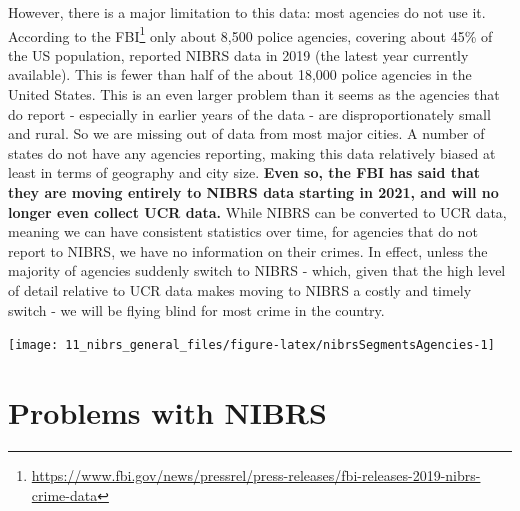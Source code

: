 \documentclass[
]{krantz}
\let\origfigure\figure
\let\endorigfigure\endfigure
\renewenvironment{figure}[1][2] {
    \expandafter\origfigure\expandafter[H]
} {
    \endorigfigure
}
\renewcommand{\href}[2]{#2\footnote{\url{#1}}}
\begin{document}
However, there is a major limitation to this data: most
agencies do not use it.
\href{https://www.fbi.gov/news/pressrel/press-releases/fbi-releases-2019-nibrs-crime-data}{According
to the FBI} only about 8,500 police agencies, covering about
45\% of the US population, reported NIBRS data in 2019 (the
latest year currently available). This is fewer than half of
the about 18,000 police agencies in the United States. This
is an even larger problem than it seems as the agencies that
do report - especially in earlier years of the data - are
disproportionately small and rural. So we are missing out of
data from most major cities. A number of states do not have
any agencies reporting, making this data relatively biased
at least in terms of geography and city size. \textbf{Even
so, the FBI has said that they are moving entirely to NIBRS
data starting in 2021, and will no longer even collect UCR
data.} While NIBRS can be converted to UCR data, meaning we
can have consistent statistics over time, for agencies that
do not report to NIBRS, we have no information on their
crimes. In effect, unless the majority of agencies suddenly
switch to NIBRS - which, given that the high level of detail
relative to UCR data makes moving to NIBRS a costly and
timely switch - we will be flying blind for most crime in
the country.

\begin{figure}

{\centering \texttt{[image: 11\_nibrs\_general\_files/figure-latex/nibrsSegmentsAgencies-1]} 

}

\caption{The number of agencies reporting data for each of the NIBRS Segments, 1991-2023.}\label{fig:nibrsSegmentsAgencies}
\end{figure}

\section{Problems with NIBRS}\label{problems-with-nibrs}
\end{document}
